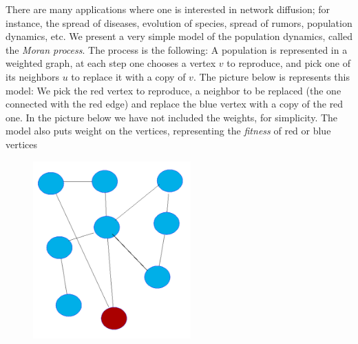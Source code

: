There are many applications where one is interested in network diffusion; for instance, the spread of diseases, evolution of species, spread of rumors, population dynamics, etc. We present a very simple model of the population dynamics, called the \emph{Moran process}. The process is the following: A population is represented in a weighted graph, at each step one chooses a vertex $v$ to reproduce, and pick one of its neighbors $u$ to replace it with a copy of $v$. The picture below is represents this model: We pick the red vertex to reproduce, a neighbor to be replaced (the one connected with the red edge) and replace the blue vertex with a copy of the red one. In the picture below we have not included the weights, for simplicity. The model also puts weight on the vertices, representing the \emph{fitness} of red or blue vertices 
	\begin{figure}[H]
	  \centering
	  \begin{minipage}[b]{0.2\textwidth}
	    \includegraphics[width=\textwidth]{season3/303/images/dots1.png}
	  \end{minipage}
	  \hspace{3cm}
	  \begin{minipage}[b]{0.2\textwidth}

\end{minipage}
\end{figure}
